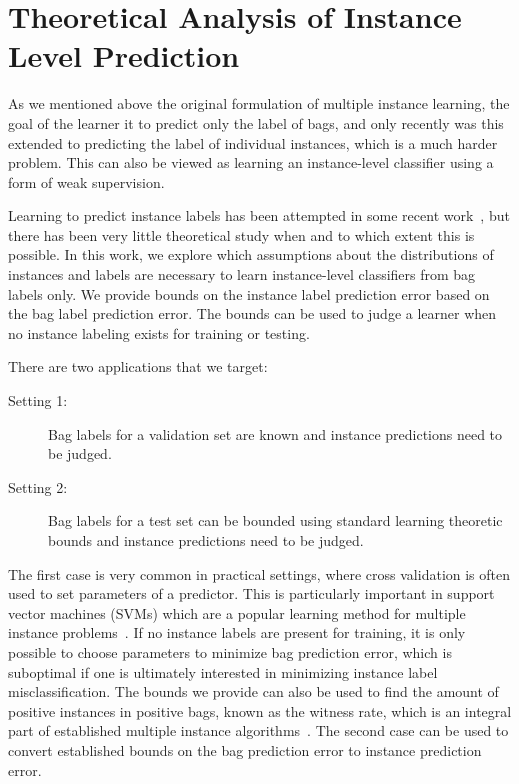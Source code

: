\section{Theoretical Analysis of Instance Level Prediction}

As we mentioned above the original formulation of multiple instance learning, the goal of the learner
it to predict only the label of bags, and only recently was this extended to predicting
the label of individual instances, which is a much harder problem.
This can also be viewed as learning an instance-level classifier using a form of weak supervision.

Learning to predict instance labels has been attempted in some recent work~\citep{liconvex2010,zhang2002dd}, but
 there has been very little theoretical study when and to which extent this is possible.
In this work, we explore which assumptions about the distributions of instances and labels
are necessary to learn instance-level classifiers from bag labels only.
We provide bounds on the instance label prediction error based on the
bag label prediction error. The bounds can be used to judge a learner when no
instance labeling exists for training or testing.

There are two applications that we target:
\begin{description}
\item[Setting 1:] Bag labels for a validation set are known and instance predictions need to be judged.
\item[Setting 2:] Bag labels for a test set can be bounded using standard learning theoretic bounds and instance
predictions need to be judged.
\end{description}
The first case is very common in practical settings, where cross validation is
often used to set parameters of a predictor. This is particularly important in
support vector machines (SVMs) which are a popular learning method for multiple
instance problems~\citep{andrews2003support}. If no instance labels are
present for training, it is only possible to choose parameters to minimize bag
prediction error, which is suboptimal if one is ultimately interested in
minimizing instance label misclassification. The bounds we provide can also be used to
find the amount of positive instances in positive bags, known as the witness
rate, which is an integral part of established multiple instance
algorithms~\citep{zhang2002dd,liconvex2010}. The second case can be used to
convert established bounds on the bag prediction error to instance prediction
error.

